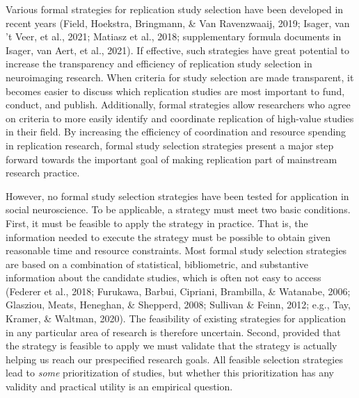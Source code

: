 \documentclass[
  man,floatsintext]{apa6}
\begin{document}
Various formal strategies for replication study selection have been developed in recent years (Field, Hoekstra, Bringmann, \& Van Ravenzwaaij, 2019; Isager, van 't Veer, et al., 2021; Matiasz et al., 2018; supplementary formula documents in Isager, van Aert, et al., 2021). If effective, such strategies have great potential to increase the transparency and efficiency of replication study selection in neuroimaging research. When criteria for study selection are made transparent, it becomes easier to discuss which replication studies are most important to fund, conduct, and publish. Additionally, formal strategies allow researchers who agree on criteria to more easily identify and coordinate replication of high-value studies in their field. By increasing the efficiency of coordination and resource spending in replication research, formal study selection strategies present a major step forward towards the important goal of making replication part of mainstream research practice.

However, no formal study selection strategies have been tested for application in social neuroscience. To be applicable, a strategy must meet two basic conditions. First, it must be feasible to apply the strategy in practice. That is, the information needed to execute the strategy must be possible to obtain given reasonable time and resource constraints. Most formal study selection strategies are based on a combination of statistical, bibliometric, and substantive information about the candidate studies, which is often not easy to access (Federer et al., 2018; Furukawa, Barbui, Cipriani, Brambilla, \& Watanabe, 2006; Glasziou, Meats, Heneghan, \& Shepperd, 2008; Sullivan \& Feinn, 2012; e.g., Tay, Kramer, \& Waltman, 2020). The feasibility of existing strategies for application in any particular area of research is therefore uncertain. Second, provided that the strategy is feasible to apply we must validate that the strategy is actually helping us reach our prespecified research goals. All feasible selection strategies lead to \emph{some} prioritization of studies, but whether this prioritization has any validity and practical utility is an empirical question.
\end{document}
